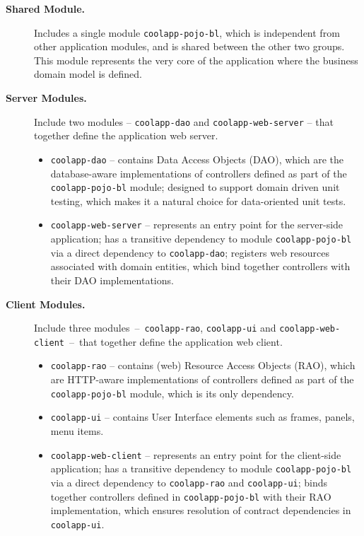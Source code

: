   \begin{description}
    \item[\textbf{Shared Module.}] Includes a single module \texttt{coolapp-pojo-bl}, which is independent from other application modules, and is shared between the other two groups.
	This module represents the very core of the application where the business domain model is defined.   
    \item[\textbf{Server Modules.}] Include two modules -- \texttt{coolapp-dao} and \texttt{coolapp-web-server} -- that together define the application web server.	
      \begin{itemize}
	\item \texttt{coolapp-dao} -- contains Data Access Objects (DAO), which are the database-aware implementations of controllers defined as part of the \texttt{coolapp-pojo-bl} module; designed to support domain driven unit testing, which makes it a natural choice for data-oriented unit tests.
	\item \texttt{coolapp-web-server} -- represents an entry point for the server-side application; has a transitive dependency to module \texttt{coolapp-pojo-bl} via a direct dependency to \texttt{coolapp-dao}; registers web resources associated with domain entities, which bind together controllers with their DAO implementations.
      \end{itemize}
    \item[\textbf{Client Modules.}] Include three modules~--~\texttt{coolapp-rao}, \texttt{coolapp-ui} and \texttt{coolapp-web-client}~--~that together define the application web client.
      \begin{itemize}
	\item \texttt{coolapp-rao} -- contains (web) Resource Access Objects (RAO), which are HTTP-aware implementations of controllers defined as part of the \texttt{coolapp-pojo-bl} module, which is its only dependency.
	\item \texttt{coolapp-ui} -- contains User Interface elements such as frames, panels, menu items.
	\item \texttt{coolapp-web-client} -- represents an entry point for the client-side application; has a transitive dependency to module \texttt{coolapp-pojo-bl} via a direct dependency to \texttt{coolapp-rao} and \texttt{coolapp-ui}; binds together controllers defined in \texttt{coolapp-pojo-bl} with their RAO implementation, which ensures resolution of contract dependencies in \texttt{coolapp-ui}.
      \end{itemize}
   \end{description}

